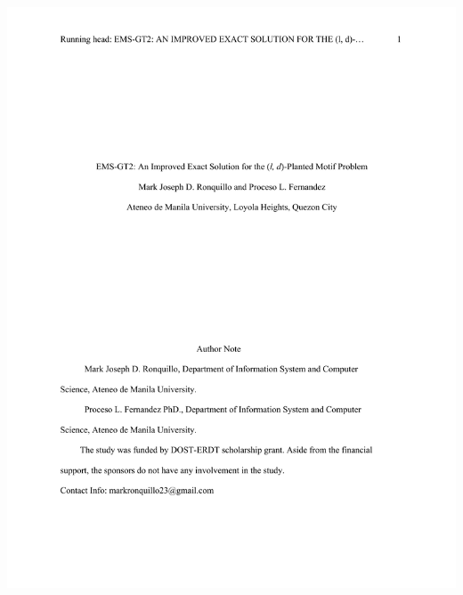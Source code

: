 	\label{appendix:MNE-586-105}
	
	\includegraphics[page=1, scale = 0.8]{contents/appendix/MNE-586-105.pdf}
